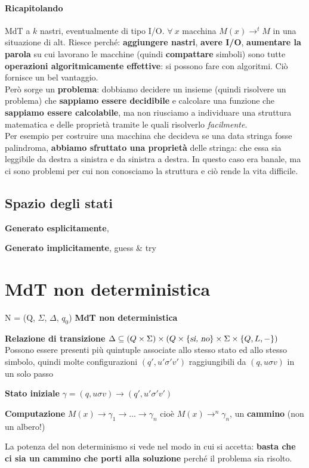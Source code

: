\documentclass[10pt]{book}
\begin{document}
\paragraph{Ricapitolando} MdT a $k$ nastri, eventualmente di tipo I/O. $\forall\:x$ macchina $M(x) \rightarrow^t M$ in una situazione di alt.
Riesce perché: \textbf{aggiungere nastri}, \textbf{avere I/O}, \textbf{aumentare la parola} su cui lavorano le macchine (quindi \textbf{compattare} simboli) sono tutte \textbf{operazioni algoritmicamente effettive}: si possono fare con algoritmi. Ciò fornisce un bel vantaggio.\\
Però sorge un \textbf{problema}: dobbiamo decidere un insieme (quindi risolvere un problema) che \textbf{sappiamo essere decidibile} e calcolare una funzione che \textbf{sappiamo essere calcolabile}, ma non riusciamo a individuare una struttura matematica e delle proprietà tramite le quali risolverlo \textit{facilmente}.\\
Per esempio per costruire una macchina che decideva se una data stringa fosse palindroma, \textbf{abbiamo sfruttato una proprietà} delle stringa: che essa sia leggibile da destra a sinistra e da sinistra a destra. In questo caso era banale, ma ci sono problemi per cui non conosciamo la struttura e ciò rende la vita difficile.
\subsection{Spazio degli stati}
\begin{list}{}{Lo spazio degli stati di una MdT può essere}
	\item \textbf{Generato esplicitamente}, 
	\item \textbf{Generato implicitamente}, guess \& try
\end{list}
\section{MdT non deterministica}
N = (Q, $\Sigma$, $\Delta$, $q_0$) \textbf{MdT non deterministica}
\begin{list}{}{}
	\item \textbf{Relazione di transizione} $\Delta \subseteq (Q\times\Sigma)\times(Q\times\{\textsl{si, no}\}\times\Sigma\times\{Q, L, -\})$\\
	Possono essere presenti più quintuple associate allo stesso stato ed allo stesso simbolo, quindi molte configurazioni $(q', u'\sigma'v')$ raggiungibili da $(q, u\sigma v)$ in un solo passo
	\item \textbf{Stato iniziale} $\gamma = (q, u\sigma v) \rightarrow (q', u'\sigma'v')$
	\item \textbf{Computazione} $M(x) \rightarrow\gamma_1\rightarrow\ldots\rightarrow\gamma_n$ cioè $M(x) \rightarrow^n\gamma_n$, un \textbf{cammino} (non un albero!)
\end{list}
La potenza del non determinismo si vede nel modo in cui si accetta: \textbf{basta che ci sia un cammino che porti alla soluzione} perché il problema sia risolto.
\pagebreak
\end{document}
